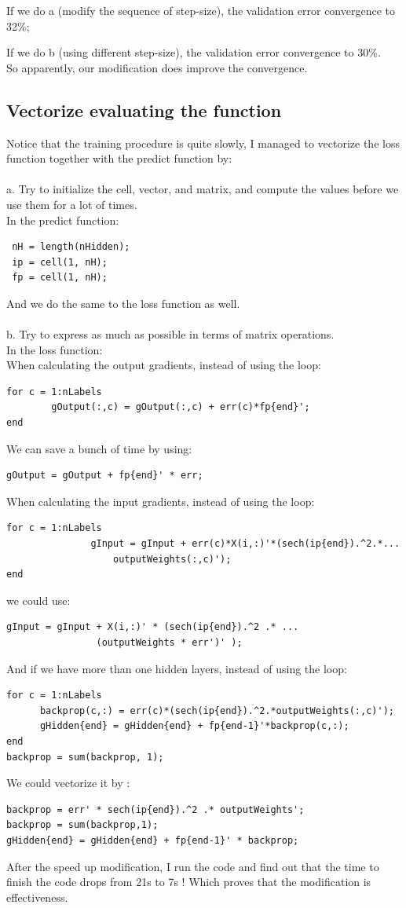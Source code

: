 \documentclass[12pt]{article}
\begin{document}
If we do  a (modify the sequence of step-size), the validation error convergence to 32\%;

If we do  b (using different step-size), the validation error convergence to 30\%. \\
So apparently, our modification does improve the convergence.\\

\subsection{Vectorize evaluating the function}
Notice that the training procedure is quite slowly, I managed to vectorize the loss function together with the predict function by:\\
\\
a. Try to initialize the cell, vector, and matrix, and compute the values before we use them for a lot of times.\\
In the predict function:
\begin{lstlisting}
 nH = length(nHidden);
 ip = cell(1, nH);
 fp = cell(1, nH);
\end{lstlisting}
And we do the same to the loss function as well.\\
\\
b. Try to express as much as possible in terms of matrix operations.\\
In the loss function:\\
When calculating the output gradients, instead of using the loop:
\begin{lstlisting}
for c = 1:nLabels
		gOutput(:,c) = gOutput(:,c) + err(c)*fp{end}';
end
\end{lstlisting}
We can save a bunch of time by using:
\begin{lstlisting}
gOutput = gOutput + fp{end}' * err;
\end{lstlisting}
When calculating the input gradients, instead of using the loop:
\begin{lstlisting}
for c = 1:nLabels
               gInput = gInput + err(c)*X(i,:)'*(sech(ip{end}).^2.*...
                   outputWeights(:,c)');
end
\end{lstlisting}
we could use:
\begin{lstlisting}
gInput = gInput + X(i,:)' * (sech(ip{end}).^2 .* ...
                (outputWeights * err')' );   
\end{lstlisting}        
And if we have more than one hidden layers, instead of using the loop:
\begin{lstlisting}
for c = 1:nLabels
      backprop(c,:) = err(c)*(sech(ip{end}).^2.*outputWeights(:,c)');
      gHidden{end} = gHidden{end} + fp{end-1}'*backprop(c,:);
end
backprop = sum(backprop, 1);
\end{lstlisting}
We could vectorize it by : 
\begin{lstlisting}
backprop = err' * sech(ip{end}).^2 .* outputWeights';
backprop = sum(backprop,1);
gHidden{end} = gHidden{end} + fp{end-1}' * backprop;
\end{lstlisting}
After the speed up modification, I run the code and find out that the time to finish the code drops from 21s to 7s ! Which proves that the modification is effectiveness.
 
\end{document}
